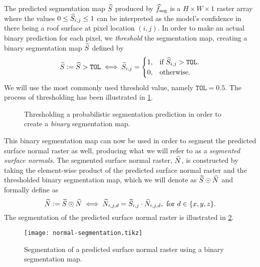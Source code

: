The predicted segmentation map $\widehat{S}$ produced by $\widehat{f}_{\mathrm{seg}}$ is a $H \times W \times 1$ raster array where the values $0 \leq \widehat{S}_{i,j} \leq 1$ can be interpreted as the model's confidence in there being a roof surface at pixel location $(i, j)$.
In order to make an actual binary prediction for each pixel, we \textit{threshold} the segmentation map, creating a binary segmentation map $\widetilde{S}$ defined by
\begin{equation*}
  \widetilde{S} \vcentcolon= \widehat{S} > \texttt{TOL}
  \iff
  \widetilde{S}_{i, j}
  =
  \begin{cases}
    1, &\text{if } \widehat{S}_{i, j} > \texttt{TOL}. \\
    0, &\text{otherwise.}
  \end{cases}
\end{equation*}
We will use the most commonly used threshold value, namely $\texttt{TOL} = 0.5$.
The process of thresholding has been illustrated in \cref{fig:activation-thresholding}.
\begin{figure}[H]
  \centering
  \caption{Thresholding a probabilistic segmentation prediction in order to create a \textit{binary} segmentation map.}%
  \label{fig:activation-thresholding}
\end{figure}
\noindent
This binary segmentation map can now be used in order to segment the predicted surface normal raster as well, producing what we will refer to as a \textit{segmented surface normals}.
The segmented surface normal raster, $\widetilde{N}$, is constructed by taking the element-wise product of the predicted surface normal raster and the thresholded binary segmentation map, which we will denote as $\widetilde{S} \odot \widehat{N}$ and formally define as
\begin{equation*}
  \widetilde{N} \vcentcolon= \widetilde{S} \odot \widehat{N}
  \iff
  \widetilde{N}_{i, j, d}
  =
    \widetilde{S}_{i, j}
    \cdot
    \widehat{N}_{i, j, d},
  \text{ for } d \in \{x, y, z\}.
\end{equation*}
The segmentation of the predicted surface normal raster is illustrated in \cref{fig:normal-segmentation}.
\begin{figure}[H]
  \centering
  \texttt{[image: normal-segmentation.tikz]}
  \caption{Segmentation of a predicted surface normal raster using a binary segmentation map.}%
  \label{fig:normal-segmentation}
\end{figure}
